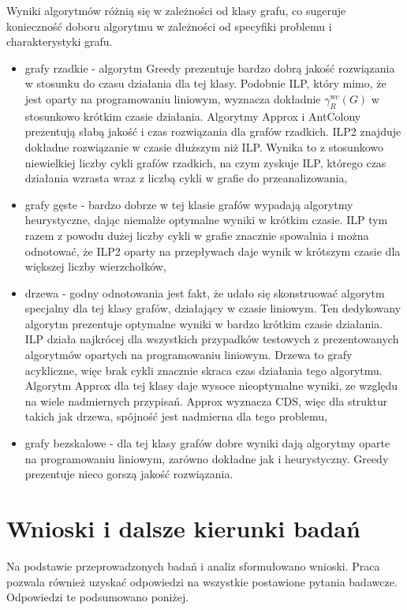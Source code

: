 Wyniki algorytmów różnią się w zależności od klasy grafu, co sugeruje konieczność doboru algorytmu w zależności od specyfiki problemu i charakterystyki grafu.
\begin{itemize}
    \item grafy rzadkie - algorytm Greedy prezentuje bardzo dobrą jakość rozwiązania w stosunku do czasu działania dla tej klasy. Podobnie ILP, który mimo, że jest oparty na programowaniu liniowym, wyznacza dokładnie $\gamma^{\text{wc}}_R(G)$ w stosunkowo krótkim czasie działania. Algorytmy Approx i AntColony prezentują słabą jakość i czas rozwiązania dla grafów rzadkich. ILP2 znajduje dokładne rozwiązanie w czasie dłuższym niż ILP. Wynika to z stosunkowo niewielkiej liczby cykli grafów rzadkich, na czym zyskuje ILP, którego czas działania wzrasta wraz z liczbą cykli w grafie do przeanalizowania,
    \item grafy gęste - bardzo dobrze w tej klasie grafów wypadają algorytmy heurystyczne, dając niemalże optymalne wyniki w krótkim czasie. ILP tym razem z powodu dużej liczby cykli w grafie znacznie spowalnia i można odnotować, że ILP2 oparty na przepływach daje wynik w krótszym czasie dla większej liczby wierzchołków,
    \item drzewa - godny odnotowania jest fakt, że udało się skonstruować algorytm specjalny dla tej klasy grafów, działający w czasie liniowym. Ten dedykowany algorytm prezentuje optymalne wyniki w bardzo krótkim czasie działania. ILP działa najkrócej dla wszystkich przypadków testowych z prezentowanych algorytmów opartych na programowaniu liniowym. Drzewa to grafy acykliczne, więc brak cykli znacznie skraca czas działania tego algorytmu. Algorytm Approx dla tej klasy daje wysoce nieoptymalne wyniki, ze względu na wiele nadmiernych przypisań. Approx wyznacza CDS, więc dla struktur takich jak drzewa, spójność jest nadmierna dla tego problemu,
    \item grafy bezskalowe - dla tej klasy grafów dobre wyniki dają algorytmy oparte na programowaniu liniowym, zarówno dokładne jak i heurystyczny. Greedy prezentuje nieco gorszą jakość rozwiązania.
\end{itemize}

\section{Wnioski i dalsze kierunki badań}
Na podstawie przeprowadzonych badań i analiz sformułowano wnioski. Praca pozwala również uzyskać odpowiedzi na wszystkie postawione pytania badawcze. Odpowiedzi te podsumowano poniżej.

